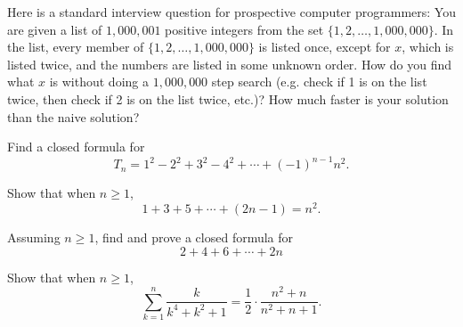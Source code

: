 \begin{pro}
Here is a standard interview question for prospective computer programmers: 
You are given a list of $1,000,001$ positive integers from the set
$\{1,2,\ldots , 1,000,000\}$. 
In the list, every member of  $\{1,2,\ldots , 1,000,000\}$ 
is listed once, except for $x$, which is listed twice, and the numbers are listed in some unknown order. 
How do you find what $x$ is without doing a $1,000,000$ step search (e.g. check if 1 is on the list twice, then check if 2 is on 
the list twice, etc.)?
How much faster is your solution than the naive solution?
\end{pro}

\begin{pro} Find a closed formula for
$$T_n = 1^2 - 2^2 + 3^2 - 4^2 + \cdots + (-1)^{n - 1}n^2.$$
\end{pro}

\begin{pro} Show that when $n\geq 1$, 
$$1 + 3 + 5 + \cdots + (2n - 1) = n^2.$$
\end{pro}

\begin{pro} Assuming $n\geq 1$, find and prove a closed formula for   
$$2+4+6+\cdots+ 2n$$
\end{pro}

\begin{pro} Show that when $n\geq 1$, 
$$\sum _{k = 1} ^n \frac{k}{k^4 + k^2 + 1} = \frac{1}{2}\cdot\frac{n^2 + n}{n^2 + n + 1}.$$
\end{pro}

\newpage

